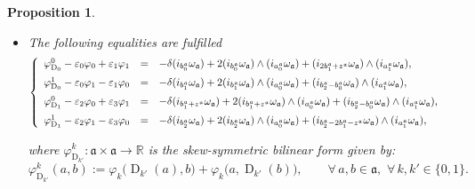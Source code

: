 \documentclass[final,1p,times,nopreprintline]{elsarticle}
\newtheorem{proposition}{Proposition}[section]
\theoremstyle{definition}
\numberwithin{equation}{section}
\newcommand{\rel}{\mathbb{R}}
\newcommand{\w}{\omega}
\newcommand{\ai}{\mathfrak{a}}
\numberwithin{equation}{section}
\newcommand{\D}{\operatorname{D}}
\newcommand{\gl}{\mathfrak{gl}}
\begin{document}
\begin{proposition}
\begin{itemize}
where $z^\ai\cdot i_{a^\ai_0}\w_\ai\in\gl(\ai)\,$ given by $\,\big(z^\ai\cdot i_{a^\ai_0}\w_\ai\big)(a):=\w_\ai(a^\ai_0,a)z^\ai\,;$
	\item[$6.$] The following equalities are fulfilled
	\begin{equation}\label{PropSymLiAlgDoblExtDim2Prop0-C4}
		\left\{
		\begin{array}{r c l}\vspace{2mm}
			\varphi^0_{\D_{0}}-\varepsilon_0\varphi_0+\varepsilon_1\varphi_1&=&-\delta(i_{b^\ai_0}\w_\ai)+2(i_{b^\ai_0}\w_\ai)\wedge (i_{a^\ai_0}\w_\ai)+(i_{2b^\ai_1+z^\ai}\w_\ai)\wedge (i_{a^\ai_1}\w_\ai),\\\vspace{2mm}
			\varphi^1_{\D_{0}}-\varepsilon_0\varphi_1-\varepsilon_1\varphi_0&=&-\delta(i_{b^\ai_1}\w_\ai)+2(i_{b^\ai_1}\w_\ai)\wedge (i_{a^\ai_0}\w_\ai)+(i_{b^\ai_2-b^\ai_0}\w_\ai)\wedge (i_{a^\ai_1}\w_\ai),\\\vspace{2mm}
			\varphi^0_{\D_{1}}-\varepsilon_2\varphi_0+\varepsilon_3\varphi_1&=&-\delta(i_{b^\ai_1+z^\ai}\w_\ai)+2(i_{b^\ai_1+z^\ai}\w_\ai)\wedge (i_{a^\ai_0}\w_\ai)+(i_{b^\ai_2-b^\ai_0}\w_\ai)\wedge (i_{a^\ai_1}\w_\ai),\\
			\varphi^1_{\D_{1}}-\varepsilon_2\varphi_1-\varepsilon_3\varphi_0&=&-\delta(i_{b^\ai_2}\w_\ai)+2(i_{b^\ai_2}\w_\ai)\wedge (i_{a^\ai_0}\w_\ai)+(i_{b^\ai_2-2b^\ai_1-z^\ai}\w_\ai)\wedge (i_{a^\ai_1}\w_\ai),\qquad\qquad
		\end{array}	
		\right.
	\end{equation}
	
where $\varphi^k_{\D_{k'}}:\ai\times\ai\to\rel$ is the skew-symmetric bilinear form given by:
	\begin{equation*}
		\varphi^k_{\D_{k'}}(a,b):=\varphi_k\big(\D_{k'}(a),b\big)+\varphi_k\big(a,\D_{k'}(b)\big),\qquad\forall\,a,b\in\ai,\,\,\forall\,k,k'\in\{0,1\}.
	\end{equation*}
\end{itemize}
\end{proposition}
\end{document}
